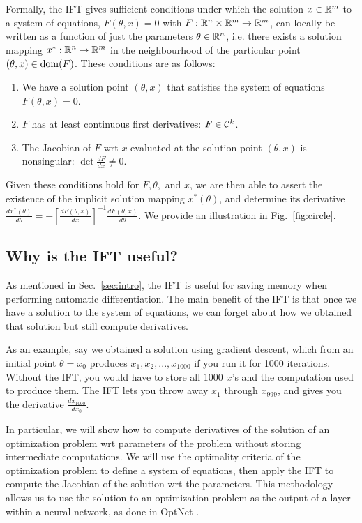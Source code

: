 \documentclass[11pt]{article}
\begin{document}
Formally, the IFT gives sufficient conditions under which the solution $x\in\mathbb{R}^m$
to a system of equations, $F(\theta, x) = 0$ with $F: \mathbb{R}^n\times\mathbb{R}^m\to\mathbb{R}^m$,
can locally be written as a function of just the parameters $\theta\in\mathbb{R}^n$,
i.e. there exists a solution mapping $x^*:\mathbb{R}^n\to\mathbb{R}^m$
in the neighbourhood of the particular point $(\theta,x)\in\mathrm{dom }(F)$.
These conditions are as follows:
\begin{enumerate}
\item We have a solution point $(\theta, x)$ that satisfies the system of equations
    $F(\theta, x) = 0$.
\item $F$ has at least continuous first derivatives: $F \in \mathcal{C}^k$.
\item The Jacobian of $F$ wrt $x$ evaluated at the solution point $(\theta,x)$ is nonsingular:
    $\det \frac{d F}{d x} \neq 0$.
\end{enumerate}
Given these conditions hold for $F,\theta,$ and $x$, we are then
able to assert the existence of the implicit solution mapping $x^*(\theta)$,
and determine its derivative
$\frac{d x^*(\theta)}{d\theta} = -[\frac{dF(\theta,x)}{dx}]^{-1}
    \frac{d F(\theta,x)}{d\theta}$.
We provide an illustration in Fig.~\ref{fig:circle}.

\subsection{Why is the IFT useful?}
As mentioned in Sec.~\ref{sec:intro}, the IFT is useful for saving memory when performing
automatic differentiation.
The main benefit of the IFT is that once we have a solution to the system of equations,
we can forget about how we obtained that solution but still compute derivatives.

As an example, say we obtained a solution using gradient descent,
which from an initial point $\theta = x_0$
produces $x_1, x_2, ..., x_1000$ if you run it for 1000 iterations.
Without the IFT, you would have to store all 1000 $x$'s
and the computation used to produce them.
The IFT lets you throw away $x_1$ through $x_999$, and gives you the derivative
$\frac{dx_1000}{dx_0}$.

In particular, we will show how to compute derivatives of the solution of an optimization problem
wrt parameters of the problem without storing intermediate computations.
We will use the optimality criteria of the optimization problem to define a system of equations,
then apply the IFT to compute the Jacobian of the solution wrt the parameters.
This methodology allows us to use the solution to an optimization problem
as the output of a layer within a neural network,
as done in OptNet \citep{optnet}.
\end{document}
